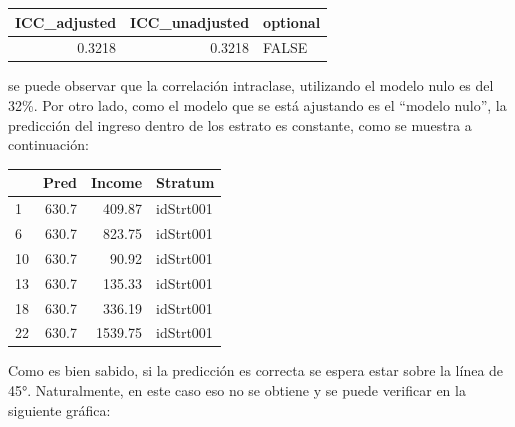\documentclass[
  spanish,
  12pt,
]{book}
\newenvironment{Shaded}{\begin{snugshade}}{\end{snugshade}}
\newcommand{\AttributeTok}[1]{\textcolor[rgb]{0.13,0.29,0.53}{#1}}
\newcommand{\CommentTok}[1]{\textcolor[rgb]{0.56,0.35,0.01}{\textit{#1}}}
\newcommand{\DataTypeTok}[1]{\textcolor[rgb]{0.13,0.29,0.53}{#1}}
\newcommand{\DecValTok}[1]{\textcolor[rgb]{0.00,0.00,0.81}{#1}}
\newcommand{\FunctionTok}[1]{\textcolor[rgb]{0.13,0.29,0.53}{\textbf{#1}}}
\newcommand{\NormalTok}[1]{#1}
\newcommand{\OtherTok}[1]{\textcolor[rgb]{0.56,0.35,0.01}{#1}}
\newcommand{\SpecialCharTok}[1]{\textcolor[rgb]{0.81,0.36,0.00}{\textbf{#1}}}
\begin{document}
\begin{tabular}{r|r|l}
\hline
ICC\_adjusted & ICC\_unadjusted & optional\\
\hline
0.3218 & 0.3218 & FALSE\\
\hline
\end{tabular}

se puede observar que la correlación intraclase, utilizando el modelo nulo es del 32\%. Por otro lado, como el modelo que se está ajustando es el ``modelo nulo'', la predicción del ingreso dentro de los estrato es constante, como se muestra a continuación:

\begin{Shaded}
\end{Shaded}

\begin{tabular}{l|r|r|l}
\hline
  & Pred & Income & Stratum\\
\hline
1 & 630.7 & 409.87 & idStrt001\\
\hline
6 & 630.7 & 823.75 & idStrt001\\
\hline
10 & 630.7 & 90.92 & idStrt001\\
\hline
13 & 630.7 & 135.33 & idStrt001\\
\hline
18 & 630.7 & 336.19 & idStrt001\\
\hline
22 & 630.7 & 1539.75 & idStrt001\\
\hline
\end{tabular}

Como es bien sabido, si la predicción es correcta se espera estar sobre la línea de 45°. Naturalmente, en este caso eso no se obtiene y se puede verificar en la siguiente gráfica:
\end{document}
